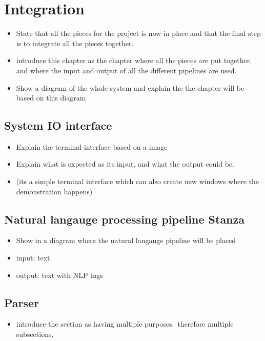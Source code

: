 \chapter{Integration}\label{ch:int}

\begin{itemize}
    \item State that all the pieces for the project is now in place and that the final step is to integrate all the pieces together.
    \item introduce this chapter as the chapter where all the pieces are put together, and where the input and output of all the different pipelines are used.
    \item Show a diagram of the whole system and explain the the chapter will be based on this diagram
\end{itemize}

\section{System IO interface}\label{sec:Integration_IO}
\begin{itemize}
    \item Explain the terminal interface based on a image
    \item Explain what is expected as its input, and what the output could be.
    \item (its a simple terminal interface which can also create new windows where the demonstration happens)
\end{itemize}


\section{Natural langauge processing pipeline \- Stanza}\label{sec:Integration_stanza}
\begin{itemize}
    \item Show in a diagram where the natural langauge pipeline will be placed
    \item input: text
    \item output: text with NLP tags
\end{itemize}

\section{Parser}
\begin{itemize}
    \item introduce the section as having multiple purposes.\ therefore multiple subsections.
\end{itemize}

